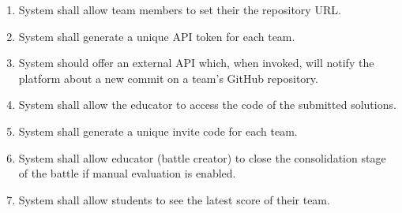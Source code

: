 \begin{enumerate}[label=$\bullet$ \textbf{R\arabic*:}]
    \item System shall allow team members to set their the repository URL.
    \item System shall generate a unique API token for each team.
    \item System should offer an external API which, when invoked, will notify the platform about a new commit on a team’s GitHub repository.
    \item System shall allow the educator to access the code of the submitted solutions.
    \item System shall generate a unique invite code for each team.
    \item System shall allow educator (battle creator) to close the consolidation stage of the battle if manual evaluation is enabled.
    \item System shall allow students to see the latest score of their team.
\end{enumerate}
\newpage

